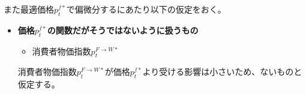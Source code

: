 また最適価格\(p_t^{f*}\)で偏微分するにあたり以下の仮定をおく。
\begin{itemize}
    \item
    \label{itm:chapter3_assumptions_producer_optimization_foreign_calculation_assumption}
        \textbf{価格\(p_t^{f*}\)の関数だがそうではないように扱うもの}
        \begin{itemize}
            \item 消費者物価指数\(p_t^{F\to W*}\)
        \end{itemize}
        消費者物価指数\(p_t^{F\to W*}\)が価格\(p_t^{f*}\)より受ける影響は小さいため、ないものと仮定する。
\end{itemize}